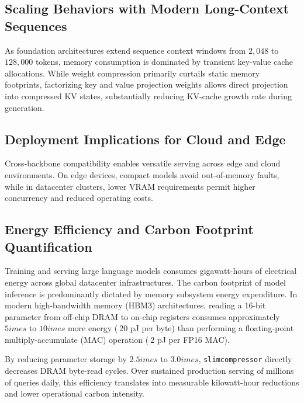 \subsection{Scaling Behaviors with Modern Long-Context Sequences}
As foundation architectures extend sequence context windows from $2{,}048$ to $128{,}000$ tokens, memory consumption is dominated by transient key-value cache allocations. While weight compression primarily curtails static memory footprints, factorizing key and value projection weights allows direct projection into compressed KV states, substantially reducing KV-cache growth rate during generation.

\subsection{Deployment Implications for Cloud and Edge}
Cross-backbone compatibility enables versatile serving across edge and cloud environments. On edge devices, compact models avoid out-of-memory faults, while in datacenter clusters, lower VRAM requirements permit higher concurrency and reduced operating costs.

\subsection{Energy Efficiency and Carbon Footprint Quantification}
Training and serving large language models consumes gigawatt-hours of electrical energy across global datacenter infrastructures. The carbon footprint of model inference is predominantly dictated by memory subsystem energy expenditure. In modern high-bandwidth memory (HBM3) architectures, reading a 16-bit parameter from off-chip DRAM to on-chip registers consumes approximately $5	imes$ to $10	imes$ more energy ($~20$ pJ per byte) than performing a floating-point multiply-accumulate (MAC) operation ($~2$ pJ per FP16 MAC).

By reducing parameter storage by $2.5	imes$ to $3.0	imes$, \texttt{slimcompressor} directly decreases DRAM byte-read cycles. Over sustained production serving of millions of queries daily, this efficiency translates into measurable kilowatt-hour reductions and lower operational carbon intensity.
